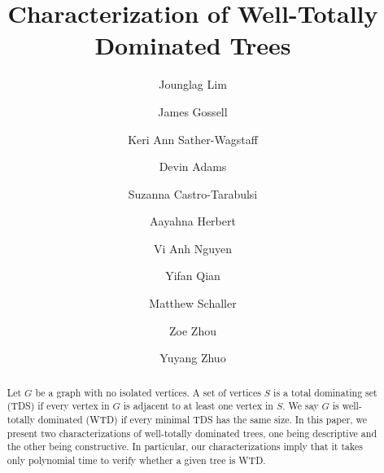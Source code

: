 \documentclass[12pt, reqno]{amsart}
\theoremstyle{definition}
\theoremstyle{plain}
\theoremstyle{definition}
\begin{document}

\title[Characterization of Well-Totally Dominated Trees]{Characterization of Well-Totally Dominated Trees}

\author[Lim, et al.]{Jounglag Lim}
\address{School of mathematical and statistical sciences, Clemson University, Clemson, SC 29634}

\author[]{James Gossell}
\address{Department of mathematics and statistics, University of Alaska, Fairbanks, AK 99775}

\author[]{Keri Ann Sather-Wagstaff}
\address{Framingham State University, Framingham, MA 01701}

\author[]{Devin Adams}

\author[]{Suzanna Castro-Tarabulsi}
\address{Mathematical Sciences, George Mason University,  Fairfax, VA 22030}


\author[]{Aayahna Herbert}
\address{School of mathematical and statistical sciences, Clemson University, Clemson, SC 29634}

\author[]{Vi Anh Nguyen}
\address{Department of Mathematics, University of Illinois Urbana-Champaign, Urbana, IL 61801}

\author[]{Yifan Qian}


\author[]{Matthew Schaller}
\address{School of mathematical and statistical sciences, Clemson University, Clemson, SC 29634}

\author[]{Zoe Zhou}
\address{Columbia university irving medical center, Columbia University, New York, NY 10032}

\author[]{Yuyang Zhuo}
\address{Department of mathematics, The Ohio State University, Columbus, OH 43210}

\begin{abstract}
    Let $G$ be a graph with no isolated vertices.
    A set of vertices $S$ is a total dominating set (TDS) if every vertex in $G$ is adjacent to at least one vertex in $S$.
    We say $G$ is well-totally dominated (WTD) if every minimal TDS has the same size.
    In this paper, we present two characterizations of well-totally dominated trees, one being descriptive and the other being constructive.
    In particular, our characterizations imply that it takes only polynomial time to verify whether a given tree is WTD.
\end{abstract}
\end{document}
